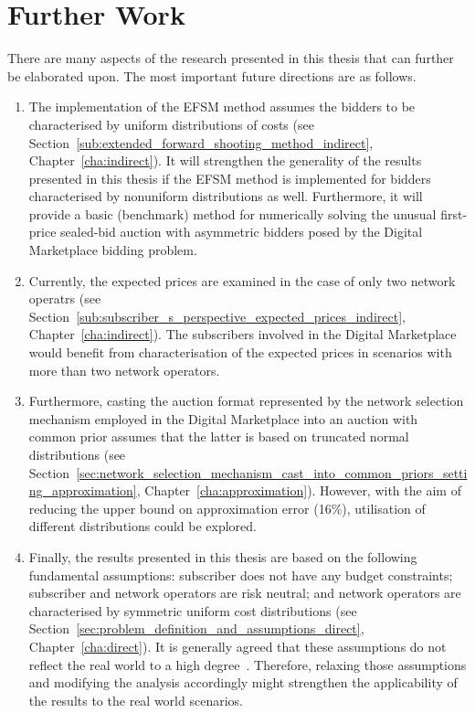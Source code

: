\section{Further Work} %
\label{sec:further_work_conclusions}
There are many aspects of the research presented in this thesis that can further be elaborated upon. The most important future directions are as follows.
\begin{enumerate}
\item The implementation of the EFSM method assumes the bidders to be characterised by uniform distributions of costs (see Section~\ref{sub:extended_forward_shooting_method_indirect}, Chapter~\ref{cha:indirect}). It will strengthen the generality of the results presented in this thesis if the EFSM method is implemented for bidders characterised by nonuniform distributions as well. Furthermore, it will provide a basic (benchmark) method for numerically solving the unusual first-price sealed-bid auction with asymmetric bidders posed by the Digital Marketplace bidding problem.
\item Currently, the expected prices are examined in the case of only two network operatrs (see Section~\ref{sub:subscriber_s_perspective_expected_prices_indirect}, Chapter~\ref{cha:indirect}). The subscribers involved in the Digital Marketplace would benefit from characterisation of the expected prices in scenarios with more than two network operators.
\item Furthermore, casting the auction format represented by the network selection mechanism employed in the Digital Marketplace into an auction with common prior assumes that the latter is based on truncated normal distributions (see Section~\ref{sec:network_selection_mechanism_cast_into_common_priors_setting_approximation}, Chapter~\ref{cha:approximation}). However, with the aim of reducing the upper bound on approximation error (16\%), utilisation of different distributions could be explored.
\item Finally, the results presented in this thesis are based on the following fundamental assumptions: subscriber does not have any budget constraints; subscriber and network operators are risk neutral; and network operators are characterised by symmetric uniform cost distributions (see Section~\ref{sec:problem_definition_and_assumptions_direct}, Chapter~\ref{cha:direct}). It is generally agreed that these assumptions do not reflect the real world to a high degree~\cite{Krishna10}. Therefore, relaxing those assumptions and modifying the analysis accordingly might strengthen the applicability of the results to the real world scenarios.
\end{enumerate}
